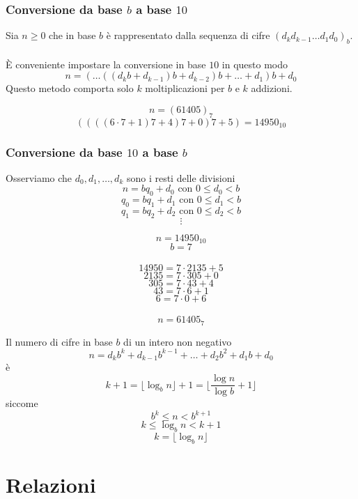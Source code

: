 \documentclass[a4paper,12pt, oneside]{book}
\begin{document}
\subsection{Conversione da base \textbf{$b$} a base \textbf{$10$}}
\begin{teorema}
	Sia $n \geq 0$ che in base $b$ è rappresentato dalla sequenza di cifre $(d_k d_{k-1} \dots d_1 d_0)_b$.\\\\
	È conveniente impostare la conversione in base $10$ in questo modo
	$$n = ( \dots ((d_kb+d_{k-1})b+d_{k-2})b+ \dots +d_1)b+d_0$$
	Questo metodo comporta solo $k$ moltiplicazioni per $b$ e $k$ addizioni.
\end{teorema}
\begin{shaded}
	\begin{esempio}
		$$n = (61405)_7$$ $$((((6 \cdot 7 + 1)7 + 4)7+0)7+5) = 14950_{10}$$
	\end{esempio}
\end{shaded}

\subsection{Conversione da base \textbf{$10$} a base \textbf{$b$}}
\begin{teorema}
	Osserviamo che $d_0, d_1, \dots, d_k$ sono i resti delle divisioni
	$$n = bq_0 +d_0 \mbox{ con } 0 \leq d_0 < b$$
	$$q_0 = bq_1 +d_1 \mbox{ con } 0 \leq d_1 < b$$
	$$q_1 = bq_2 +d_2 \mbox{ con } 0 \leq d_2< b$$
	$$ \vdots $$
\end{teorema}
\begin{shaded}
	\begin{esempio}
		$$n = 14950_{10}$$
		$$b=7$$\\
		$$14950 = 7 \cdot 2135 + 5$$
		$$2135 = 7 \cdot 305 + 0$$
		$$305 = 7 \cdot 43 + 4$$
		$$43 = 7 \cdot 6 + 1$$
		$$6 = 7 \cdot 0 + 6$$\\
		$$n = 61405_{7}$$
	\end{esempio}
\end{shaded}
\begin{osservazione}
	Il numero di cifre in base $b$ di un intero non negativo
	$$n = d_{k}b^{k} + d_{k-1}b^{k-1} + \dots + d_{2}b^{2} + d_{1}b + d_0$$ è
	$$k+1 = \lfloor \log_bn \rfloor+1 = \lfloor \frac{\log n}{\log b}+1 \rfloor$$
	siccome
	$$b^k \leq n < b^{k+1}$$
	$$k \leq \log_bn < k+1$$
	$$k=\lfloor \log_bn \rfloor$$
\end{osservazione}

\chapter{Relazioni}
\end{document}
